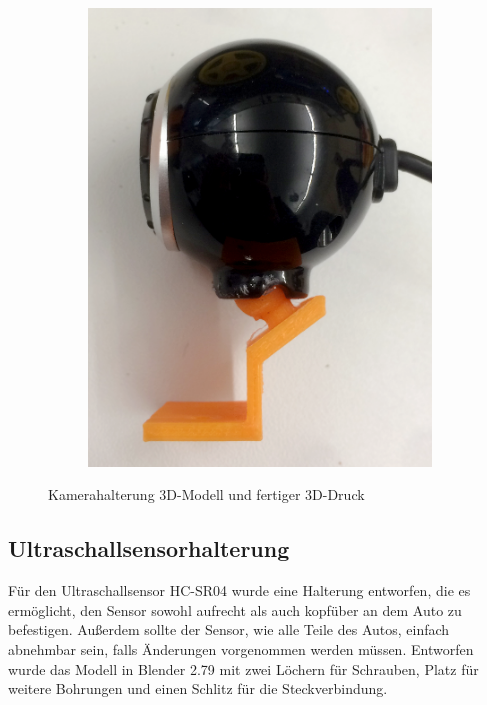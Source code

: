 \documentclass[a4paper, 12pt]{scrartcl}
\begin{document}
\begin{figure}[H]
\begin{subfigure}{.25\textwidth}
		\includegraphics[width=\textwidth]{../bilder_videos/Kamerahalterung.png}
	\end{subfigure}%
	\caption{Kamerahalterung 3D-Modell und fertiger 3D-Druck}
	\label{kamerahalterung}
\end{figure}


\subsection{Ultraschallsensorhalterung}

Für den Ultraschallsensor HC-SR04 wurde eine Halterung entworfen, die es ermöglicht, den Sensor sowohl aufrecht als auch kopfüber an dem Auto zu befestigen. Außerdem sollte der Sensor, wie alle Teile des Autos, einfach abnehmbar sein, falls Änderungen vorgenommen werden müssen. Entworfen wurde das Modell in Blender 2.79 mit zwei Löchern für Schrauben, Platz für weitere Bohrungen und einen Schlitz für die Steckverbindung.
\end{document}
